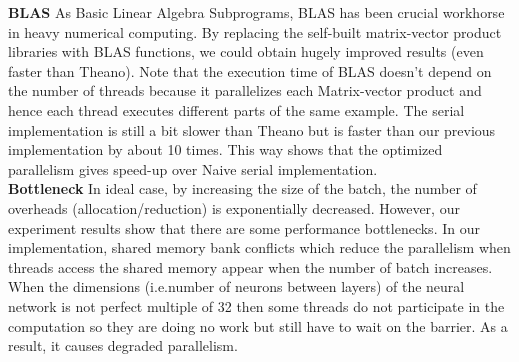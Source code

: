 \textbf{BLAS} As Basic Linear Algebra Subprograms, BLAS has been crucial workhorse in heavy numerical computing. By replacing the self-built matrix-vector product libraries with BLAS functions, we could obtain hugely improved results (even faster than Theano). Note that the execution time of BLAS doesn't depend on the number of threads because it parallelizes each Matrix-vector product and hence each thread executes different parts of the same example. The serial implementation is still a bit slower than Theano but is faster than our previous implementation by about 10 times. This way shows that the optimized parallelism gives speed-up over Naive serial implementation. \\

\textbf{Bottleneck} In ideal case, by increasing the size of the batch, the number of overheads (allocation/reduction) is exponentially decreased. However, our experiment results show that there are some performance bottlenecks. In our implementation, shared memory bank conflicts which reduce the parallelism when threads access the shared memory appear when the number of batch increases. When the dimensions (i.e.number of neurons between layers) of the neural network is not perfect multiple of 32 then some threads do not participate in the computation so they are doing no work but still have to wait on the barrier. As a result, it causes degraded parallelism.\\

